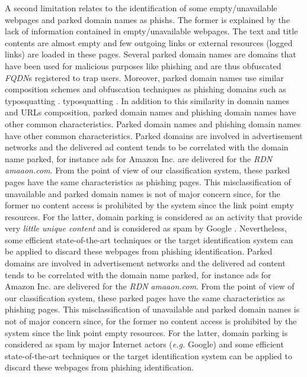 \documentclass[10pt,conference,compsocconf,letterpaper]{IEEEtran}
\begin{document}
A second limitation relates to the identification of some empty/unavailable webpages and parked domain names as phishs. The former is explained by the lack of information contained in empty/unavailable webpages. 
\iffullversion
The text and title contents are almost empty and few outgoing links or external resources (logged links) are loaded in these pages.
\fi 
Several parked domain names are domains that have been used for malicious purposes like phishing \cite{li:2013:finding} and are thus obfuscated \textit{FQDN}s registered to trap users. Moreover, parked domain names use similar composition schemes and obfuscation techniques as phishing domains 
\cite{vissers:2015:parking} such as
\iffeateval
typosquatting \cite{agten:2015:seven,szurdi:2014:long}.
\else
typosquatting \cite{szurdi:2014:long}.
\fi 
\iffullversion
In addition to this similarity in domain names and URLs composition, parked domain names and phishing domain names have other common characteristics. 
\else
Parked domain names and phishing domain names have other common characteristics.
\fi
\iffeateval
Parked domains are involved in advertisement networks \cite{alrwais:2014:understanding} and the delivered ad content tends to be correlated with the domain name parked, for instance ads for Amazon Inc. are delivered for the \textit{RDN} \textit{amaaon.com}. 
From the point of view of our classification system, these parked pages have the same characteristics as phishing pages. 
This misclassification of unavailable and parked domain names is not of major concern since, for the former no content access is prohibited by the system since the link point empty resources. For the latter, domain parking is considered as an activity that provide very \textit{little unique content} and is considered as spam by Google \cite{google:spam}. Nevertheless, some efficient state-of-the-art techniques \cite{vissers:2015:parking} or the target identification system can be applied to discard these webpages from phishing identification.
\else
Parked domains are involved in advertisement networks \cite{alrwais:2014:understanding} and the delivered ad content tends to be correlated with the domain name parked, for instance ads for Amazon Inc. are delivered for the \textit{RDN} \textit{amaaon.com}.
From the point of view of our classification system, these parked pages have the same characteristics as phishing pages. 
This misclassification of unavailable and parked domain names is not of major concern since, for the former no content access is prohibited by the system since the link point empty resources. For the latter, domain parking is considered as spam by major Internet actors (\textit{e.g.} Google) and some efficient state-of-the-art techniques \cite{vissers:2015:parking} or the target identification system can be applied to discard these webpages from phishing identification.
\fi
\end{document}
